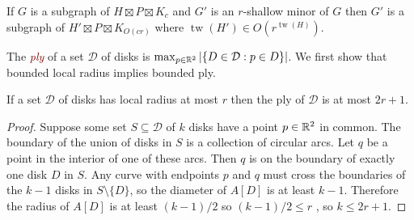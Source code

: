 \documentclass{patmorin}
\newcommand{\defin}[1]{\textcolor{Maroon}{\emph{#1}}}
\DeclareMathOperator{\tw}{tw}
\begin{document}
\begin{thm}\label{h_w_shallow_minor}
  If $G$ is a subgraph of $H\boxtimes P\boxtimes K_c$ and $G'$ is an $r$-shallow minor of $G$ then $G'$ is a subgraph of $H' \boxtimes P \boxtimes K_{O(cr)}$ where $\tw(H') \in O(r^{\tw(H)})$.
\end{thm}

The \defin{ply} of a set $\mathcal{D}$ of disks is $\max_{p\in\mathbb{R}^2}|\{D\in\mathcal{D}:p\in D\}|$.  We first show that bounded local radius implies bounded ply.

\begin{lem}\label{ply}
  If a set $\mathcal{D}$ of disks has local radius at most $r$ then the ply of $\mathcal{D}$ is at most $2r+1$.
\end{lem}

\begin{proof}
  Suppose some set $S\subseteq\mathcal{D}$ of $k$ disks have a point $p\in \mathbb{R}^2$ in common.  The boundary of the union of disks in $S$ is a collection of circular arcs.  Let $q$ be a point in the interior of one of these arcs.  Then $q$ is on the boundary of exactly one disk $D$ in $S$.  Any curve with endpoints $p$ and $q$ must cross the boundaries of the $k-1$ disks in $S \setminus \{D\}$, so the diameter of $A[D]$ is at least $k-1$.  Therefore the radius of $A[D]$ is at least $(k-1)/2$ so $(k - 1)/2 \le r$ , so $k \le  2r+1$.
\end{proof}
\end{document}
